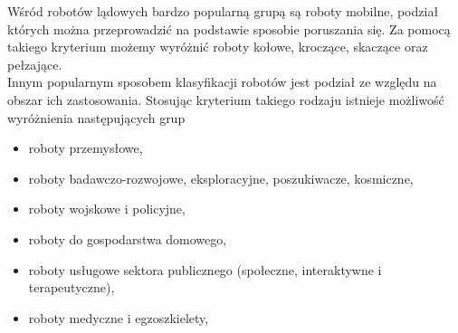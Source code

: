 Wśród robotów lądowych bardzo popularną grupą są roboty mobilne, podział których
można przeprowadzić na podstawie sposobie poruszania się. Za pomocą takiego
kryterium możemy wyróżnić roboty kołowe, kroczące, skaczące oraz pełzające.\\
Innym popularnym sposobem klasyfikacji robotów jest podział ze względu na 
obszar ich zastosowania. Stosując kryterium takiego rodzaju istnieje możliwość
wyróżnienia następujących grup
\begin{itemize}
  \item roboty przemysłowe,
  \item roboty badawczo-rozwojowe, eksploracyjne, poszukiwacze, kosmiczne,
  \item roboty wojskowe i policyjne,
  \item roboty do gospodarstwa domowego,
  \item roboty usługowe sektora publicznego (społeczne, interaktywne i
  terapeutyczne),
  \item roboty medyczne i egzoszkielety,
\end{itemize}

